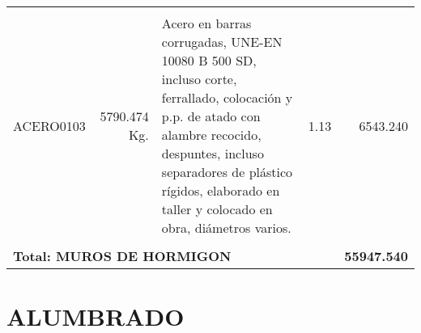 \documentclass{book}%
\begin{document}
\begin{longtable}{lrlrr}
&&&&\\%
ACERO0103&5790.474 Kg.&\multicolumn{1}{p{5cm}}{Acero en barras corrugadas, UNE{-}EN 10080 B 500 SD, incluso corte, ferrallado, colocación y p.p. de atado con alambre recocido, despuntes, incluso separadores de plástico rígidos, elaborado en taller y colocado en obra, diámetros varios.}&1.13&6543.240\\%
&&&&\\%
\multicolumn{4}{p{8cm}}{\textbf{Total: MUROS DE HORMIGON}}&\textbf{55947.540}\\%
\end{longtable}%
\normalsize

%
\section{ALUMBRADO}%
\label{sec:ALUMBRADO}%
\small%
\end{document}
